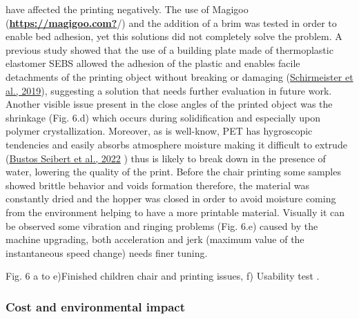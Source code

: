 \documentclass[
  12pt,
  number,
  review]{elsarticle}
\begin{document}
have affected the printing negatively. The use of Magigoo
(\protect\hyperlink{ref-https:ux2fux2fmagigoo.com}{\textbf{https://magigoo.com?}}/)
and the addition of a brim was tested in order to enable bed adhesion,
yet this solutions did not completely solve the problem. A previous
study showed that the use of a building plate made of thermoplastic
elastomer SEBS allowed the adhesion of the plastic and enables facile
detachments of the printing object without breaking or damaging
(\protect\hyperlink{ref-schirmeister2019}{Schirmeister et al., 2019}),
suggesting a solution that needs further evaluation in future work.
Another visible issue present in the close angles of the printed object
was the shrinkage (Fig. 6.d) which occurs during solidification and
especially upon polymer crystallization. Moreover, as is well-know, PET
has hygroscopic tendencies and easily absorbs atmosphere moisture making
it difficult to extrude
(\protect\hyperlink{ref-bustosseibert2022}{Bustos Seibert et al., 2022}
) thus is likely to break down in the presence of water, lowering the
quality of the print. Before the chair printing some samples showed
brittle behavior and voids formation therefore, the material was
constantly dried and the hopper was closed in order to avoid moisture
coming from the environment helping to have a more printable material.
Visually it can be observed some vibration and ringing problems (Fig.
6.e) caused by the machine upgrading, both acceleration and jerk
(maximum value of the instantaneous speed change) needs finer tuning.

Fig. 6 a to e)Finished children chair and printing issues, f) Usability
test .

\hypertarget{cost-and-environmental-impact}{%
\subsubsection{Cost and environmental
impact}\label{cost-and-environmental-impact}}
\end{document}
